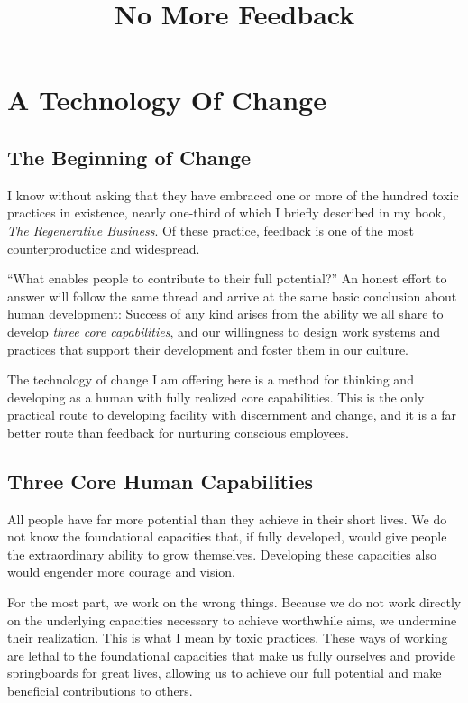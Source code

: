 \documentclass[ebook,12pt,oneside,openany]{memoir}
\begin{document}
\title{No More Feedback}
\maketitle

\section{A Technology Of Change}
\subsection{The Beginning of Change}
I know without asking that they have embraced one or more of the hundred toxic practices in existence, nearly one-third of which I briefly described in my book, \textit{The Regenerative Business}.
Of these practice, feedback is one of the most counterproductice and widespread.

``What enables people to contribute to their full potential?'' An honest effort to answer will follow the same thread and arrive at the same basic conclusion about human development:
Success of any kind arises from the ability we all share to develop \textit{three core capabilities}, and our willingness to design work systems and practices that support their development and foster them in our culture.

The technology of change I am offering here is a method for thinking and developing as a human with fully realized core capabilities.
This is the only practical route to developing facility with discernment and change, and it is a far better route than feedback for nurturing conscious employees.

\subsection{Three Core Human Capabilities}
All people have far more potential than they achieve in their short lives. We do not know the foundational capacities that, if fully developed, would give people the extraordinary ability to grow themselves.
Developing these capacities also would engender more courage and vision.

For the most part, we work on the wrong things. Because we do not work directly on the underlying capacities necessary to achieve worthwhile aims, we undermine their realization.
This is what I mean by toxic practices. These ways of working are lethal to the foundational capacities that make us fully ourselves and provide springboards for great lives, allowing us to achieve our full potential and make beneficial contributions to others.
\end{document}
